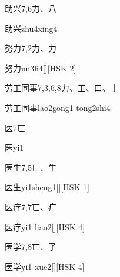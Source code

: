 \begin{entry}{助兴}{7,6}{⼒、⼋}
  \begin{phonetics}{助兴}{zhu4xing4}
  \end{phonetics}
\end{entry}

\begin{entry}{努力}{7,2}{⼒、⼒}
  \begin{phonetics}{努力}{nu3li4}[][HSK 2]
  \end{phonetics}
\end{entry}

\begin{entry}{劳工同事}{7,3,6,8}{⼒、⼯、⼝、⼅}
  \begin{phonetics}{劳工同事}{lao2gong1 tong2shi4}
  \end{phonetics}
\end{entry}

\begin{entry}{医}{7}{⼖}
  \begin{phonetics}{医}{yi1}
  \end{phonetics}
\end{entry}

\begin{entry}{医生}{7,5}{⼖、⽣}
  \begin{phonetics}{医生}{yi1sheng1}[][HSK 1]
  \end{phonetics}
\end{entry}

\begin{entry}{医疗}{7,7}{⼖、⽧}
  \begin{phonetics}{医疗}{yi1 liao2}[][HSK 4]
  \end{phonetics}
\end{entry}

\begin{entry}{医学}{7,8}{⼖、⼦}
  \begin{phonetics}{医学}{yi1 xue2}[][HSK 4]
  \end{phonetics}
\end{entry}

